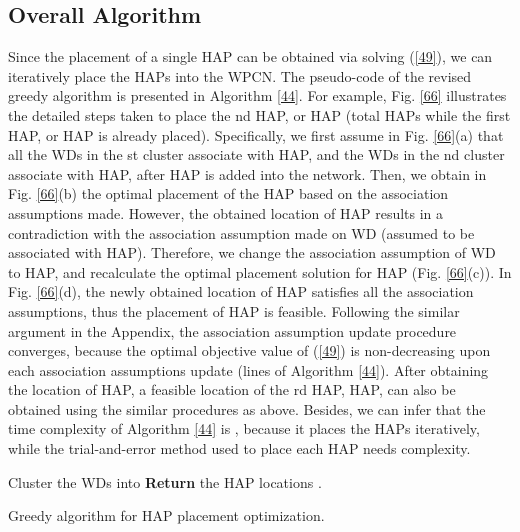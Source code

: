 \documentclass[journal, draftcls, one column, 12pt]{IEEEtran}
\begin{document}
\subsection{Overall Algorithm}
Since the placement of a single HAP can be obtained via solving (\ref{49}), we can iteratively place the  HAPs into the WPCN. The pseudo-code of the revised greedy algorithm is presented in Algorithm \ref{44}. For example, Fig. \ref{66} illustrates the detailed steps taken to place the nd HAP, or HAP (total  HAPs while the first HAP, or HAP is already placed). Specifically, we first assume in Fig. \ref{66}(a) that all the WDs in the st cluster associate with HAP, and the WDs in the nd cluster associate with HAP, after HAP is added into the network. Then, we obtain in Fig. \ref{66}(b) the optimal placement of the HAP based on the association assumptions made. However, the obtained location of HAP results in a contradiction with the association assumption made on WD (assumed to be associated with HAP). Therefore, we change the association assumption of WD to HAP, and recalculate the optimal placement solution for HAP (Fig. \ref{66}(c)). In Fig. \ref{66}(d), the newly obtained location of HAP satisfies all the association assumptions, thus the placement of HAP is feasible. Following the similar argument in the Appendix, the association assumption update procedure converges, because the optimal objective value of (\ref{49}) is non-decreasing upon each association assumptions update (lines  of Algorithm \ref{44}). After obtaining the location of HAP, a feasible location of the rd HAP, HAP, can also be obtained using the similar procedures as above. Besides, we can infer that the time complexity of Algorithm \ref{44} is , because it places the  HAPs iteratively, while the trial-and-error method used to place each HAP needs  complexity.



\begin{algorithm}
\footnotesize
 \SetAlgoLined
  Cluster the WDs into \;
\textbf{Return} the HAP locations .
\caption{Greedy algorithm for HAP placement optimization.}
\label{44}
\end{algorithm}
\end{document}
